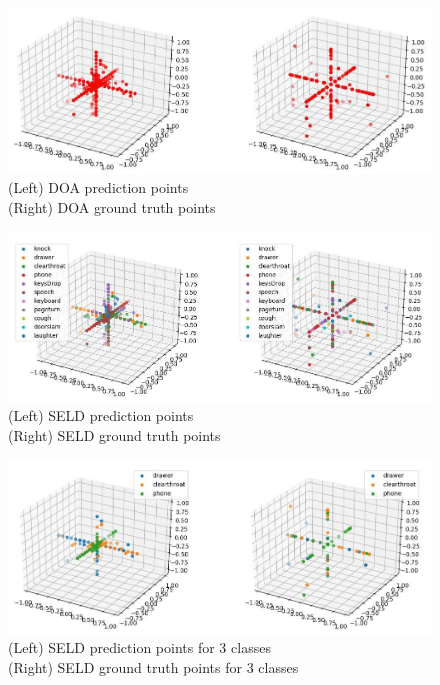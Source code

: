 \documentclass[11pt]{article}
\begin{document}
\newpage
\begin{figure}[h!]
	\centering
	\hspace*{-2.5cm}
	\includegraphics[width=17.7cm]{img/plot_doa.jpg}
	\caption{(Left) DOA prediction points \\ \hspace{1cm} (Right) DOA ground truth points}
	\label{fig:plot_doa}
\end{figure}

\begin{figure}[h!]
	\centering
	\hspace*{-2.5cm}
	\includegraphics[width=17.7cm]{img/plot_labels.jpg}
	\caption{(Left) SELD prediction points\\ (Right) SELD ground truth points}
	\label{fig:plot_labels}
\end{figure}

\newpage
\begin{figure}[h!]
	\centering
	\hspace*{-2.5cm}
	\includegraphics[width=17.7cm]{img/plot_3labels.jpg}
	\caption{(Left) SELD prediction points for 3 classes\\ (Right) SELD ground truth points for 3 classes}
	\label{fig:plot_3labels}
\end{figure}
\end{document}
